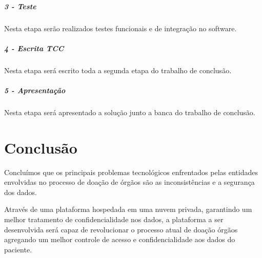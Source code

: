 \documentclass[portuguese,oneside]{tcc}
\begin{document}
\paragraph*{3 - Teste}
Nesta etapa serão realizados testes funcionais e de integração no software.

\paragraph*{4 - Escrita TCC}
Nesta etapa será escrito toda a segunda etapa do trabalho de conclusão.

\paragraph*{5 - Apresentação}
Nesta etapa será apresentado a solução junto a banca do trabalho de conclusão.


\chapter{Conclusão}
Concluímos que os principais problemas tecnológicos enfrentados pelas entidades envolvidas no processo de doação de órgãos são as inconsistências e a segurança dos dados. 
 
Através de uma plataforma hospedada em uma nuvem privada, garantindo um melhor tratamento de confidencialidade nos dados, a plataforma a ser desenvolvida será capaz de revolucionar o processo atual de doação órgãos agregando um melhor controle de acesso e confidencialidade aos dados do paciente.






\end{document}
